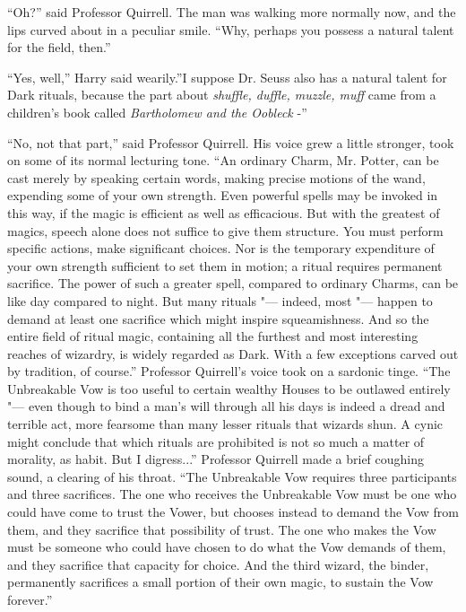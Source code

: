 ``Oh?'' said Professor Quirrell. The man was walking more normally now,
and the lips curved about in a peculiar smile. ``Why, perhaps you
possess a natural talent for the field, then.''

``Yes, well,'' Harry said wearily.''I suppose Dr. Seuss also has a
natural talent for Dark rituals, because the part about \emph{shuffle,
duffle, muzzle, muff} came from a children's book called
\emph{Bartholomew and the Oobleck} -''

``No, not that part,'' said Professor Quirrell. His voice grew a little
stronger, took on some of its normal lecturing tone. ``An ordinary
Charm, Mr. Potter, can be cast merely by speaking certain words, making
precise motions of the wand, expending some of your own strength. Even
powerful spells may be invoked in this way, if the magic is efficient as
well as efficacious. But with the greatest of magics, speech alone does
not suffice to give them structure. You must perform specific actions,
make significant choices. Nor is the temporary expenditure of your own
strength sufficient to set them in motion; a ritual requires permanent
sacrifice. The power of such a greater spell, compared to ordinary
Charms, can be like day compared to night. But many rituals "--- indeed,
most "--- happen to demand at least one sacrifice which might inspire
squeamishness. And so the entire field of ritual magic, containing all
the furthest and most interesting reaches of wizardry, is widely
regarded as Dark. With a few exceptions carved out by tradition, of
course.'' Professor Quirrell's voice took on a sardonic tinge. ``The
Unbreakable Vow is too useful to certain wealthy Houses to be outlawed
entirely "--- even though to bind a man's will through all his days is
indeed a dread and terrible act, more fearsome than many lesser rituals
that wizards shun. A cynic might conclude that which rituals are
prohibited is not so much a matter of morality, as habit. But I
digress...'' Professor Quirrell made a brief coughing sound, a
clearing of his throat. ``The Unbreakable Vow requires three
participants and three sacrifices. The one who receives the Unbreakable
Vow must be one who could have come to trust the Vower, but chooses
instead to demand the Vow from them, and they sacrifice that possibility
of trust. The one who makes the Vow must be someone who could have
chosen to do what the Vow demands of them, and they sacrifice that
capacity for choice. And the third wizard, the binder, permanently
sacrifices a small portion of their own magic, to sustain the Vow
forever.''

